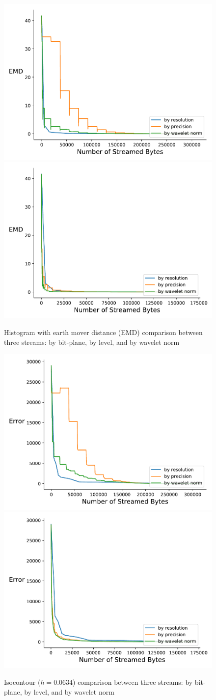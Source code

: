 \begin{figure}[htb!]
	\centering
	{\includegraphics[width=0.4\linewidth]{img/independent/histogram-miranda-viscosity}}
	{\includegraphics[width=0.4\linewidth]{img/skip-zeros/histogram-miranda-viscosity}}
	\caption {Histogram with earth mover distance (EMD) comparison between three streams: by bit-plane, by level, and by wavelet norm}
	\label{fig:histogram_traditional_vs_by_norm_viscosity}
\end{figure}

\begin{figure}[htb!]
	\centering
	{\includegraphics[width=0.4\linewidth]{img/independent/isocontour-miranda-viscosity}}
	{\includegraphics[width=0.4\linewidth]{img/skip-zeros/isocontour-miranda-viscosity}}
	\caption {Isocontour ($h = 0.0634$) comparison between three streams: by bit-plane, by level, and by wavelet norm}
	\label{fig:isocontour_traditional_vs_by_norm_viscosity}
\end{figure}

